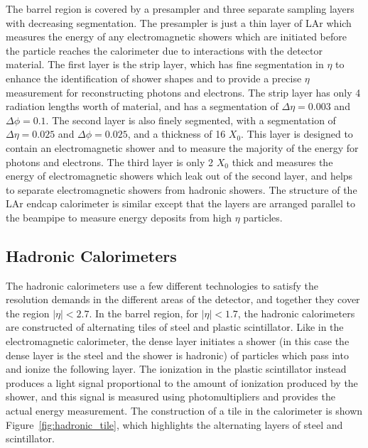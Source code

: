 The barrel region is covered by a presampler and three separate sampling layers with decreasing segmentation.
The presampler is just a thin layer of \acl{LAr} which measures the energy of any electromagnetic showers which are initiated before the particle reaches the calorimeter due to interactions with the detector material.
The first layer is the strip layer, which has fine segmentation in $\eta$ to enhance the identification of shower shapes and to provide a precise $\eta$ measurement for reconstructing photons and electrons.
The strip layer has only 4 radiation lengths worth of material, and has a segmentation of $\Delta\eta = 0.003$ and $\Delta\phi = 0.1$. 
The second layer is also finely segmented, with a segmentation of $\Delta\eta = 0.025$ and $\Delta\phi = 0.025$, and a thickness of 16 $X_0$.
This layer is designed to contain an electromagnetic shower and to measure the majority of the energy for photons and electrons.
The third layer is only 2 $X_0$ thick and measures the energy of electromagnetic showers which leak out of the second layer, and helps to separate electromagnetic showers from hadronic showers. 
The structure of the \ac{LAr} endcap calorimeter is similar except that the layers are arranged parallel to the beampipe to measure energy deposits from high $\eta$ particles.


\subsection{Hadronic Calorimeters}

The hadronic calorimeters use a few different technologies to satisfy the resolution demands in the different areas of the detector, and together they cover the region $|\eta| < 2.7$.
In the barrel region, for $|\eta| < 1.7$, the hadronic calorimeters are constructed of alternating tiles of steel and plastic scintillator. 
Like in the electromagnetic calorimeter, the dense layer initiates a shower (in this case the dense layer is the steel and the shower is hadronic) of particles which pass into and ionize the following layer.
The ionization in the plastic scintillator instead produces a light signal proportional to the amount of ionization produced by the shower, and this signal is measured using photomultipliers and provides the actual energy measurement.
The construction of a tile in the calorimeter is shown Figure~\ref{fig:hadronic_tile}, which highlights the alternating layers of steel and scintillator.

